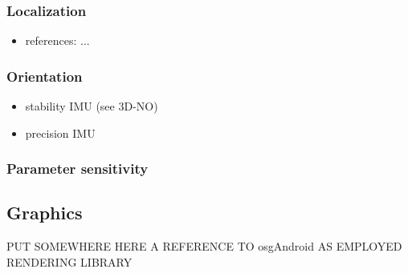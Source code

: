 \documentclass[review]{elsarticle}
\begin{document}
\subsubsection{Localization}

\begin{itemize}
\item references: ...
\end{itemize}

\subsubsection{Orientation}

\begin{itemize}
\item stability IMU (see 3D-NO)
\item precision IMU
\end{itemize}

\subsubsection{Parameter sensitivity}

\subsection{Graphics}

PUT SOMEWHERE HERE A REFERENCE TO osgAndroid AS EMPLOYED RENDERING LIBRARY
\end{document}
